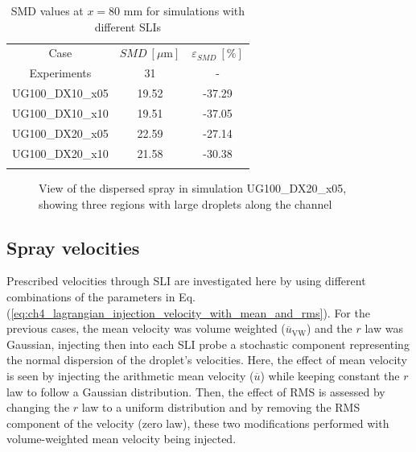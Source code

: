 \begin{table}[!h]
\centering
\caption{SMD values at $x = 80$ mm for simulations with different SLIs}
\begin{tabular}{ccc}
\thickhline
Case & $SMD~\left[\mu \mathrm{m} \right]$ & $\varepsilon_{SMD}~\left[\% \right]$ \\
\thickhline
Experiments & 31 & - \\
UG100\_DX10\_x05 & 19.52 & -37.29 \\
UG100\_DX10\_x10 & 19.51 & -37.05 \\
UG100\_DX20\_x05 & 22.59 & -27.14 \\
UG100\_DX20\_x10 & 21.58 & -30.38 \\
\thickhline
\end{tabular}
\label{tab:SMD_deviations_turb_inj}
\end{table}

\begin{figure}[h!]
	\centering	{}
	\caption{View of the dispersed spray in simulation UG100\_DX20\_x05, showing three regions with large droplets along the channel}
	\label{fig:JICF_dx20_large_droplets}
\end{figure}

\subsection{Spray velocities}
\label{subsec:SLI_LGS_velocity_effects}

Prescribed velocities through SLI are investigated here by using different combinations of the parameters in Eq. (\ref{eq:ch4_lagrangian_injection_velocity_with_mean_and_rms}). For the previous cases, the mean velocity was volume weighted ($\overline{u}_\mathrm{VW}$) and the $r$ law was Gaussian, injecting then into each SLI probe a stochastic component representing the normal dispersion of the droplet's velocities. Here, the effect of mean velocity is seen by injecting the arithmetic mean velocity ($\overline{u}$) while keeping constant the $r$ law to follow a Gaussian distribution. Then, the effect of RMS is assessed by changing the $r$ law to a uniform distribution and by removing the RMS component of the velocity (zero law), these two modifications performed with volume-weighted mean velocity being injected.

